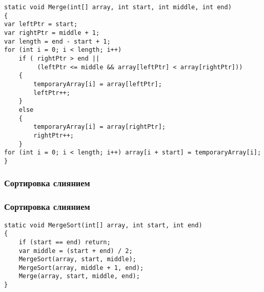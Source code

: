 \documentclass[24pt,pdf,hyperref={unicode},aspectratio=169]{beamer}
\begin{document}
\begin{frame}[fragile]
\begin{small}
\begin{verbatim}
static void Merge(int[] array, int start, int middle, int end)
{
var leftPtr = start;
var rightPtr = middle + 1;
var length = end - start + 1;
for (int i = 0; i < length; i++)
    if ( rightPtr > end || 
         (leftPtr <= middle && array[leftPtr] < array[rightPtr]))
    {
        temporaryArray[i] = array[leftPtr];
        leftPtr++;
    }
    else 
    {
        temporaryArray[i] = array[rightPtr];
        rightPtr++;
    }
for (int i = 0; i < length; i++) array[i + start] = temporaryArray[i];
}
\end{verbatim}
\end{small}
\end{frame}

\begin{frame}\frametitle{Сортировка слиянием}
\begin{center}
\end{center}
\end{frame}


\begin{frame}[fragile]\frametitle{Сортировка слиянием}
\begin{verbatim}
static void MergeSort(int[] array, int start, int end)
{
    if (start == end) return;
    var middle = (start + end) / 2;
    MergeSort(array, start, middle);
    MergeSort(array, middle + 1, end);
    Merge(array, start, middle, end);
}
\end{verbatim}
\end{frame}
\end{document}

